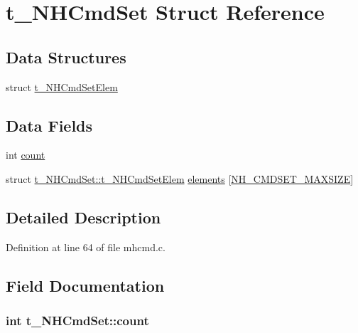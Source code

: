 \hypertarget{structt__NHCmdSet}{\section{t\+\_\+\+N\+H\+Cmd\+Set Struct Reference}
\label{structt__NHCmdSet}
}
\subsection*{Data Structures}
\begin{DoxyCompactItemize}
\item 
struct \hyperlink{structt__NHCmdSet_1_1t__NHCmdSetElem}{t\+\_\+\+N\+H\+Cmd\+Set\+Elem}
\end{DoxyCompactItemize}
\subsection*{Data Fields}
\begin{DoxyCompactItemize}
\item 
int \hyperlink{structt__NHCmdSet_ae62ce8b45a5f163808244bc70efc21cc}{count}
\item 
struct \hyperlink{structt__NHCmdSet_1_1t__NHCmdSetElem}{t\+\_\+\+N\+H\+Cmd\+Set\+::t\+\_\+\+N\+H\+Cmd\+Set\+Elem} \hyperlink{structt__NHCmdSet_a923145ebecc20823fd02173c7223fce3}{elements} \mbox{[}\hyperlink{mhcmd_8c_a45049a63e650b8163b3643a07d0fbf5b}{N\+H\+\_\+\+C\+M\+D\+S\+E\+T\+\_\+\+M\+A\+X\+S\+I\+Z\+E}\mbox{]}
\end{DoxyCompactItemize}


\subsection{Detailed Description}


Definition at line 64 of file mhcmd.\+c.



\subsection{Field Documentation}
\hypertarget{structt__NHCmdSet_ae62ce8b45a5f163808244bc70efc21cc}{
\subsubsection[{count}]{\setlength{\rightskip}{0pt plus 5cm}int t\+\_\+\+N\+H\+Cmd\+Set\+::count}}\label{structt__NHCmdSet_ae62ce8b45a5f163808244bc70efc21cc}


